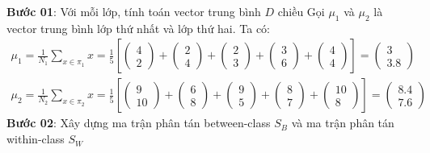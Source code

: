 \documentclass{article}
\begin{document}
	\textbf{Bước 01}: Với mỗi lớp, tính toán vector trung bình $D$ chiều\newline
	Gọi $\mu_1$ và $\mu_2$ là vector trung bình lớp thứ nhất và lớp thứ hai. Ta có:
	\begin{gather*}
		\mu_1 = \frac{1}{N_1}\sum_{x \in \pi_1}x = \frac{1}{5}\left[
		\begin{pmatrix}4\\2\end{pmatrix}
		+ \begin{pmatrix}2\\4\end{pmatrix}
		+ \begin{pmatrix}2\\3\end{pmatrix}
		+ \begin{pmatrix}3\\6\end{pmatrix}
		+ \begin{pmatrix}4\\4\end{pmatrix}
		\right]
		= \begin{pmatrix}3\\3.8\end{pmatrix}
	\end{gather*}
	\begin{gather*}
		\mu_2 = \frac{1}{N_2}\sum_{x \in \pi_2}x = \frac{1}{5}\left[
		\begin{pmatrix}9\\10\end{pmatrix}
		+ \begin{pmatrix}6\\8\end{pmatrix}
		+ \begin{pmatrix}9\\5\end{pmatrix}
		+ \begin{pmatrix}8\\7\end{pmatrix}
		+ \begin{pmatrix}10\\8\end{pmatrix}
		\right]
		= \begin{pmatrix}8.4\\7.6\end{pmatrix}
	\end{gather*}
	\textbf{Bước 02}: Xây dựng ma trận phân tán between-class $S_B$ và ma trận phân tán within-class $S_W$\newline
\end{document}

